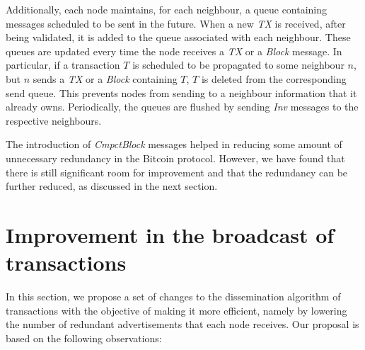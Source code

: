\documentclass{dads}   %
\begin{document}
Additionally, each node maintains, for each neighbour, a queue containing messages scheduled to be sent in the future. When a new \textsl{TX} is received, after being validated, it is added to the queue associated with each neighbour. These queues are updated every time the node receives a \textsl{TX} or a \textsl{Block} message. In particular, if a transaction $T$ is scheduled to be propagated to some neighbour $n$, but $n$ sends a \textsl{TX} or a \textsl{Block} containing $T$, $T$ is deleted from the corresponding send queue. This prevents nodes from sending to a neighbour information that it already owns. Periodically,  the queues are flushed by sending  \textsl{Inv} messages to the respective neighbours.

The introduction of \textsl{CmpctBlock} messages helped in reducing some amount of unnecessary redundancy in the Bitcoin protocol. However, we have found that there is still significant room for improvement and that the redundancy can be further reduced, as discussed in the next section.

\section{Improvement in the broadcast of transactions}
In this section, we propose a set of changes to the dissemination algorithm of transactions with the objective of making it more efficient, namely by lowering the number of redundant advertisements that each node receives. Our proposal is based on the following observations:
\end{document}
